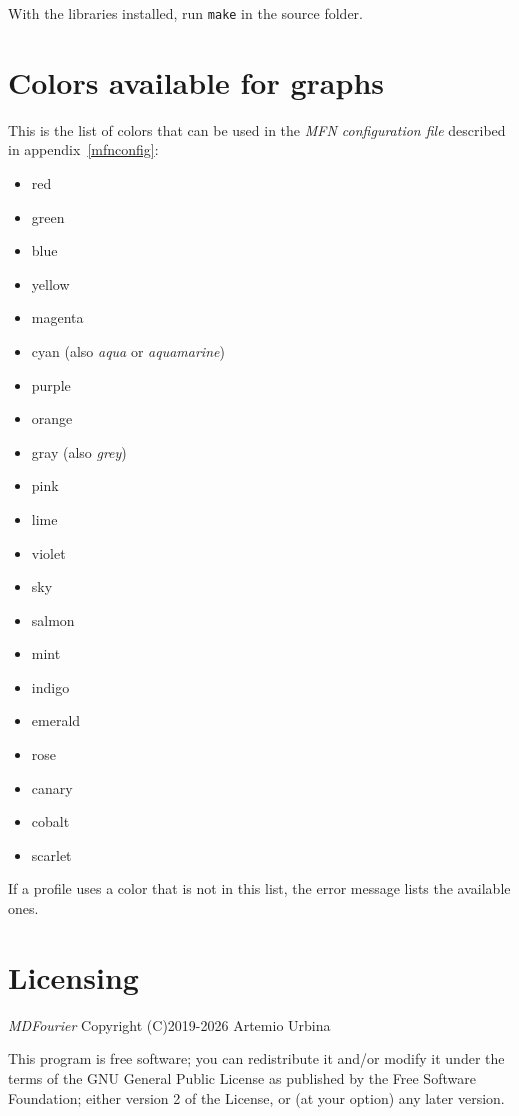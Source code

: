 \documentclass[10pt,a4paper]{report}
\begin{document}
\begin{appendices}
With the libraries installed, run \texttt{make} in the source folder.

\chapter{Colors available for graphs}
\label{availablecolors}

This is the list of colors that can be used in the \textit{MFN configuration file} described in appendix~\ref{mfnconfig}: 

\begin{itemize}
	\item red
	\item green
	\item blue
	\item yellow
	\item magenta
	\item cyan (also \textit{aqua} or \textit{aquamarine})
	\item purple
	\item orange
	\item gray (also \textit{grey})
	\item pink
	\item lime
	\item violet
	\item sky
	\item salmon
	\item mint
	\item indigo
	\item emerald
	\item rose
	\item canary
	\item cobalt
	\item scarlet
\end{itemize}

If a profile uses a color that is not in this list, the error message lists the available ones.

\chapter{Licensing}
\label{license}

\textit{MDFourier} Copyright (C)2019-2026 Artemio Urbina

This program is free software; you can redistribute it and/or modify
it under the terms of the GNU General Public License as published by
the Free Software Foundation; either version 2 of the License, or
(at your option) any later version.


\end{appendices}
\end{document}
